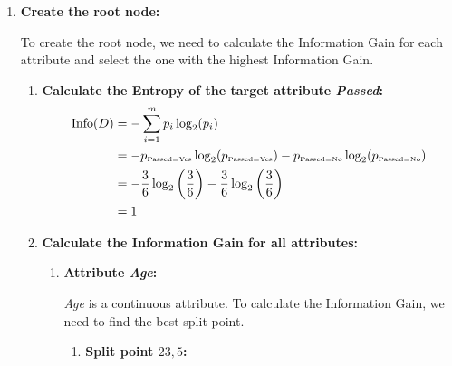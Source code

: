 \documentclass[
english,
smallborders
]{i6prcsht}
\newcommand{\OfSpecificValue}[3]{_{\text{\tiny #1#2#3}}}
\begin{document}
\begin{solution}
	\begin{enumerate}
		\item \textbf{Create the root node:}

		      To create the root node, we need to calculate the Information Gain for each attribute and select the one with the highest Information Gain.

		      \begin{enumerate}
			      \item \textbf{Calculate the Entropy of the target attribute \textit{Passed}:}
			            \begin{alignat*}{2}
				            \text{Info}(D) & = -\sum_{i=1}^{m}p_i \log_2(p_i)                                                                                                                          \\
				                           & = -p\OfSpecificValue{Passed}{=}{Yes} \log_2(p\OfSpecificValue{Passed}{=}{Yes})- p\OfSpecificValue{Passed}{=}{No} \log_2(p\OfSpecificValue{Passed}{=}{No}) \\
				                           & = -\frac{3}{6} \log_2\left(\frac{3}{6}\right) - \frac{3}{6} \log_2\left(\frac{3}{6}\right)                                                                \\
				                           & = 1                                                                                                                                                       \\
			            \end{alignat*}

			      \item \textbf{Calculate the Information Gain for all attributes:}

			            \begin{enumerate}
				            \item \textbf{Attribute \textit{Age}:}

				                  \textit{Age} is a continuous attribute. To calculate the Information Gain, we need to find the best split point.

				                  \begin{enumerate}
					                  \item \textbf{Split point $23,5$:}


\end{enumerate}
\end{enumerate}
\end{enumerate}
\end{enumerate}
\end{solution}
\end{document}
